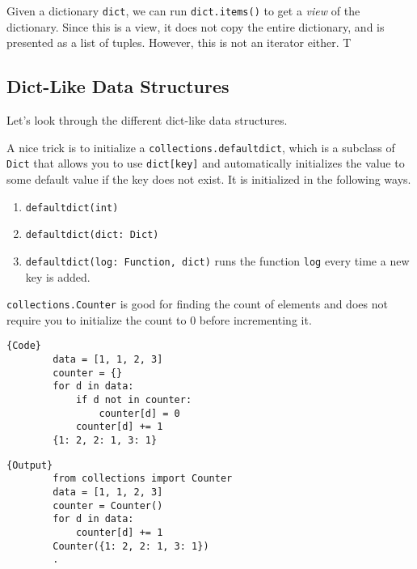 \documentclass{article}
\begin{document}
    \begin{definition}[Items]
      Given a dictionary \texttt{dict}, we can run \texttt{dict.items()} to get a \textit{view} of the dictionary. Since this is a view, it does not copy the entire dictionary, and is presented as a list of tuples. However, this is not an iterator either. T 
    \end{definition}

  \subsection{Dict-Like Data Structures}
  
    Let's look through the different dict-like data structures. 

    \begin{definition}[Defaultdict]
      A nice trick is to initialize a \texttt{collections.defaultdict}, which is a subclass of \texttt{Dict} that allows you to use \texttt{dict[key]} and automatically initializes the value to some default value if the key does not exist. It is initialized in the following ways. 
      \begin{enumerate}
        \item \texttt{defaultdict(int)} 
        \item \texttt{defaultdict(dict: Dict)} 
        \item \texttt{defaultdict(log: Function, dict)} runs the function \texttt{log} every time a new key is added. 
      \end{enumerate}
    \end{definition}

    \begin{definition}[Counter]
      \texttt{collections.Counter} is good for finding the count of elements and does not require you to initialize the count to $0$ before incrementing it. 

      \noindent\begin{minipage}{.5\textwidth}
      \begin{lstlisting}[]{Code}
        data = [1, 1, 2, 3] 
        counter = {} 
        for d in data: 
            if d not in counter: 
                counter[d] = 0 
            counter[d] += 1
        {1: 2, 2: 1, 3: 1}
      \end{lstlisting}
      \end{minipage}
      \hfill
      \begin{minipage}{.49\textwidth}
      \begin{lstlisting}[]{Output}
        from collections import Counter
        data = [1, 1, 2, 3] 
        counter = Counter() 
        for d in data: 
            counter[d] += 1 
        Counter({1: 2, 2: 1, 3: 1})
        .
      \end{lstlisting}
      \end{minipage}
    \end{definition}
\end{document}
